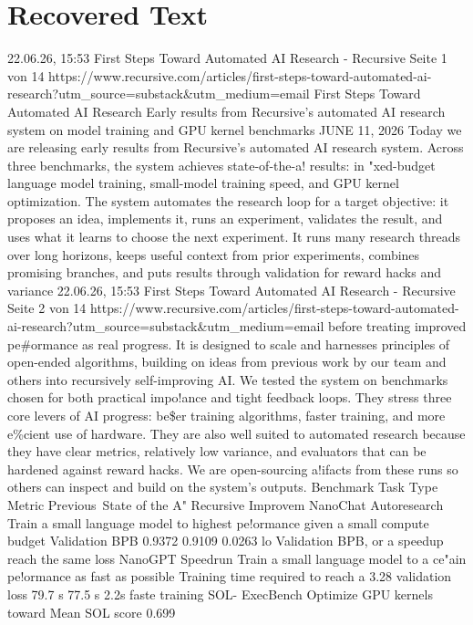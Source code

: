 \section{Recovered Text}
22.06.26, 15:53
First Steps Toward Automated AI Research - Recursive
Seite 1 von 14
https://www.recursive.com/articles/first-steps-toward-automated-ai-research?utm\_source=substack\&utm\_medium=email
First Steps Toward
Automated AI Research
Early results from Recursive’s automated AI research system
on model training and GPU kernel benchmarks
JUNE 11, 2026
Today we are releasing early results from Recursive’s automated AI research
system. Across three benchmarks, the system achieves state-of-the-a!
results: in "xed-budget language model training, small-model training
speed, and GPU kernel optimization.
The system automates the research loop for a target objective: it proposes an
idea, implements it, runs an experiment, validates the result, and uses what it
learns to choose the next experiment. It runs many research threads over long
horizons, keeps useful context from prior experiments, combines promising
branches, and puts results through validation for reward hacks and variance
22.06.26, 15:53
First Steps Toward Automated AI Research - Recursive
Seite 2 von 14
https://www.recursive.com/articles/first-steps-toward-automated-ai-research?utm\_source=substack\&utm\_medium=email
before treating improved pe\#ormance as real progress. It is designed to
scale and harnesses principles of open-ended algorithms, building on ideas
from previous work by our team and others into recursively self-improving AI.
We tested the system on benchmarks chosen for both practical impo!ance and
tight feedback loops. They stress three core levers of AI progress: be\$er training
algorithms, faster training, and more e\%cient use of hardware. They are also
well suited to automated research because they have clear metrics, relatively
low variance, and evaluators that can be hardened against reward hacks.
We are open-sourcing a!ifacts from these runs so others can inspect
and build on the system’s outputs.
Benchmark
Task Type
Metric
Previous State
of the A"
Recursive
Improvem
NanoChat
Autoresearch
Train a small
language
model to
highest
pe!ormance
given a small
compute
budget
Validation
BPB
0.9372
0.9109
0.0263 lo
Validation
BPB, or a
speedup
reach the
same loss
NanoGPT
Speedrun
Train a small
language
model to a
ce"ain
pe!ormance
as fast as
possible
Training
time
required
to reach
a 3.28
validation
loss
79.7 s
77.5 s
2.2s faste
training
SOL-
ExecBench
Optimize
GPU kernels
toward
Mean
SOL
score
0.699
